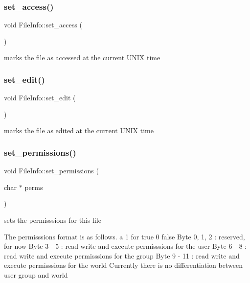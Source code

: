 \subsubsection{\texorpdfstring{set\+\_\+access()}{set\_access()}}
{\footnotesize\ttfamily void File\+Info\+::set\+\_\+access (\begin{DoxyParamCaption}{ }\end{DoxyParamCaption})}

marks the file as accessed at the current U\+N\+IX time \mbox{\label{class_file_info_a05eb10c6804660ecd47e556c27ecd019}} 
\subsubsection{\texorpdfstring{set\+\_\+edit()}{set\_edit()}}
{\footnotesize\ttfamily void File\+Info\+::set\+\_\+edit (\begin{DoxyParamCaption}{ }\end{DoxyParamCaption})}

marks the file as edited at the current U\+N\+IX time \mbox{\label{class_file_info_a377208012195dba0b24723837f6db39f}} 
\subsubsection{\texorpdfstring{set\+\_\+permissions()}{set\_permissions()}}
{\footnotesize\ttfamily void File\+Info\+::set\+\_\+permissions (\begin{DoxyParamCaption}\item[{char $\ast$}]{perms }\end{DoxyParamCaption})}



sets the permisssions for this file 

The permisssions format is as follows. a 1 for true 0 false Byte 0, 1, 2 \+: reserved, for now Byte 3 -\/ 5 \+: read write and execute permisssions for the user Byte 6 -\/ 8 \+: read write and execute permisssions for the group Byte 9 -\/ 11 \+: read write and execute permisssions for the world Currently there is no differentiation between user group and world


